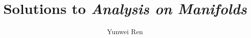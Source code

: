 

\title{Solutions to \textit{Analysis on Manifolds}}
\author{Yunwei Ren}
\date{}


\maketitle
\tableofcontents

\newpage
\setcounter{section}{1}




